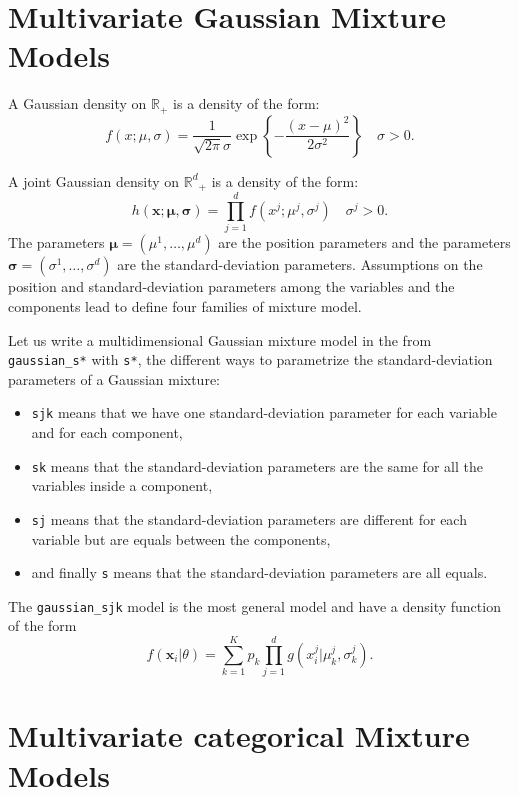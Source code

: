 \documentclass[a4paper,10pt]{article}
\newcommand{\R}{\mathbb{R}}
\newcommand{\Rd}{{\mathbb{R}^d}}
\newcommand{\bx}{\mathbf{x}}
\newcommand{\bsigma}{\boldsymbol{\sigma}}
\newcommand{\bmu}{\boldsymbol{\mu}}
\begin{document}
\section{Multivariate Gaussian Mixture Models}

A Gaussian density on $\R_+$ is a density of the form:
\begin{equation}\label{law::gaussian-density}
f(x;\mu,\sigma) = \frac{1}{\sqrt{2\pi} \sigma} \exp\left\{- \frac{(x-\mu)^2}{2\sigma^2}\right\} \quad \sigma>0.
\end{equation}

A joint Gaussian density on $\Rd_+$ is a density of the form:
\begin{equation}\label{law::joint-gaussian-density}
h(\bx;\bmu,\bsigma) = \prod_{j=1}^d f(x^j;\mu^j,\sigma^j) \quad \sigma^j>0.
\end{equation}
The parameters $\bmu=(\mu^1,\ldots,\mu^d)$ are the position parameters and the parameters $\bsigma=(\sigma^1,\ldots,\sigma^d)$
are the standard-deviation parameters. Assumptions on the position and standard-deviation parameters among the variables and the components
lead to define four families of mixture model.

Let us write a multidimensional Gaussian mixture model in the from \verb+gaussian_s*+
with \verb+s*+, the different ways to parametrize the standard-deviation parameters of a Gaussian mixture:
\begin{itemize}
\item \verb+sjk+ means that we have one standard-deviation parameter for each variable and for each component,
\item \verb+sk+ means that the standard-deviation parameters are the same for all the variables inside a component,
\item \verb+sj+ means that the standard-deviation parameters are different for each variable but are equals between the components,
\item and finally \verb+s+ means that the standard-deviation parameters are all equals.
\end{itemize}

The \verb+gaussian_sjk+ model is the most general model and have a density function of the form
\begin{equation}\label{eq:f_sjk}
  f({\bx}_i|\theta) = \sum_{k=1}^K p_k \prod_{j=1}^d g(x^j_{i}| \mu^j_{k}, \sigma^j_{k}).
\end{equation}


\section{Multivariate categorical Mixture Models}
\end{document}
